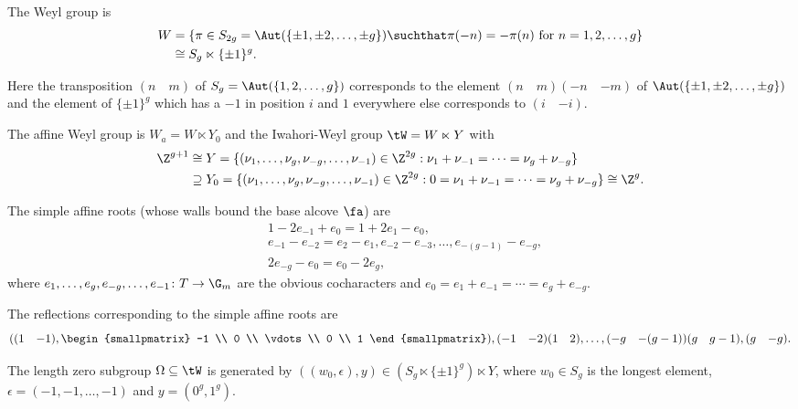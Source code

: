 \documentclass[a4paper]{scrartcl} %
\numberwithin{equation}{section}
\begin{document}
\begin{Remark}\label{root-stuff-gsp}
  The Weyl group is
  \begin{align*}
    W&=\{\pi\in S_{2g}=\Aut(\{\pm 1,\pm 2,\dotsc,\pm g\}) \suchthat \pi(-n)=-\pi(n)\text{ for } n=1,2,\dotsc,g\}\\
     &\cong S_g\ltimes\{\pm 1\}^g.
  \end{align*}
  
  Here the transposition $(n\quad m)$ of $S_g=\Aut(\{1,2,\dotsc,g\})$ corresponds to the element ${(n\quad m)(-n\quad {-m})}$ of $\Aut(\{\pm 1,\pm 2,\dotsc,\pm g\})$ and the element of $\{\pm 1\}^g$ which has a $-1$ in position $i$ and $1$ everywhere else corresponds to $(i \quad {-i})$.

  The affine Weyl group is $W_a=W\ltimes Y_0$ and the Iwahori-Weyl group $\tW=W\ltimes Y$ with
  \begin{align*}
\Z^{g+1}&\cong Y=\{(\nu_1,\dotsc,\nu_g,\nu_{-g},\dotsc,\nu_{-1})\in\Z^{2g} : \nu_1+\nu_{-1}=\dotsb=\nu_g+\nu_{-g}\} \\ &\supseteq Y_0=\{(\nu_1,\dotsc,\nu_g,\nu_{-g},\dotsc,\nu_{-1})\in\Z^{2g} : 0=\nu_1+\nu_{-1}=\dotsb=\nu_g+\nu_{-g}\}\cong\Z^g.
  \end{align*}

  The simple affine roots (whose walls bound the base alcove $\fa$) are
  \begin{align*}
    &1-2e_{-1}+e_0=1+2e_1-e_0, \\
    &e_{-1}-e_{-2}=e_2-e_1, e_{-2}-e_{-3}, \dotsc, e_{-(g-1)}-e_{-g}, \\
    &2e_{-g}-e_0=e_0-2e_g,
  \end{align*}
  where $e_1,\dotsc,e_g,e_{-g},\dotsc,e_{-1}\colon T\to\G_m$ are the obvious cocharacters and $e_0=e_1+e_{-1}=\dotsb=e_g+e_{-g}$.

  The reflections corresponding to the simple affine roots are
  \begin{equation*}
    ((1\quad{-1}),
    \begin{smallpmatrix}
      -1 \\ 0 \\ \vdots \\ 0 \\ 1
    \end{smallpmatrix}
    ),(-1\quad {-2})(1\quad 2),\dotsc,(-g\quad {-(g-1)})(g\quad {g-1}),(g\quad{-g}).
  \end{equation*}

  The length zero subgroup $\Omega\subseteq\tW$ is generated by $((w_0,\epsilon),y)\in (S_g\ltimes\{\pm1\}^g)\ltimes Y$, where $w_0\in S_g$ is the longest element, $\epsilon=(-1,-1,\dotsc,-1)$ and $y=(0^g,1^g)$.
\end{Remark}
\end{document}
